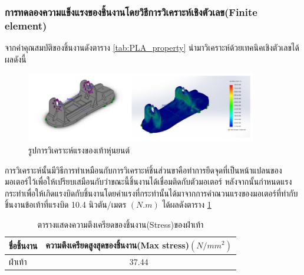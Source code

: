 \subsubsection*{การทดลองความแข็งแรงของชิ้นงานโดยวิธีการวิเคราะห์เชิงตัวเลข(Finite element)}
จากค่าคุณสมบัติของชิ้นงานดังตาราง \ref{tab:PLA_property} นำมาวิเคราะห์ด้วยเทคนิคเชิงตัวเลขได้ผลดังนี้
\begin{figure}[h!]
  \centering
  \includegraphics[width=0.9\textwidth]{chapter4/images/FEA4.PNG}
  \caption{รูปการวิเคราะห์แรงของเท้าหุ่นยนต์}
  \label{fig:FEA4}
\end{figure}

การวิเคราะห์นั้นมีวิธีการทำเหมือนกับการวิเคราะห์ชิ้นส่วนขาคือทำการยึดจุดที่เป็นหน้าแปลนของมอเตอร์ไว้เพื่อให้เปรียบเสมือนกับว่าขณะนี้ชิ้นงานได้เชื่อมติดกับตัวมอเตอร์ 
หลังจากนั้นกำหนดแรงกระทำเพื่อให้เกิดแรงบิดกับชิ้นงานโดยค่าแรงที่กระทำนั้นได้มาจากการคำณวนแรงของมอเตอร์ที่ทำกับชิ้นงานข้อเท้าที่แรงบิด 10.4 นิวตัน/เมตร $(N.m)$
ได้ผลดังตาราง \ref{tab:footstress_result}

\begin{table}[ht]
	\centering
	\begin{tabular}{| l | c |}
		\hline
		ชื่อชิ้นงาน	& ความตึงเครียดสูงสุดของชิ้นงาน(Max stress)$(N/mm^2)$ \\
        \hline
        ฝ่าเท้า & 37.44 \\
	    \hline
	\end{tabular}
	\caption{ตารางแสดงความตึงเครียดของชิ้นงาน(Stress)ของฝ่าเท้า}
	\label{tab:footstress_result}
\end{table}

\clearpage
